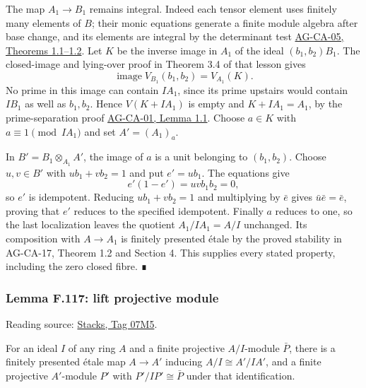 \documentclass[11pt,a4paper,openany]{report}
\begin{document}
The map \(A_1\to B_1\) remains integral. Indeed each tensor element uses finitely many elements of \(B\); their monic equations generate a finite module algebra after base change, and its elements are integral by the determinant test \href{https://github.com/KokunoYumeto/open-math-courses/blob/d02d0a3669f42579db037cd44de1d113fdd770a1/docs/courses/AG-CA/src/integral-extensions-lying-over-going-up-and-going-down.md}{AG-CA-05, Theorems 1.1--1.2}. Let \(K\) be the inverse image in \(A_1\) of the ideal \((b_1,b_2)B_1\). The closed-image and lying-over proof in Theorem 3.4 of that lesson gives \[
\operatorname{image}V_{B_1}(b_1,b_2)=V_{A_1}(K).
\] No prime in this image can contain \(IA_1\), since its prime upstairs would contain \(IB_1\) as well as \(b_1,b_2\). Hence \(V(K+IA_1)\) is empty and \(K+IA_1=A_1\), by the prime-separation proof \href{https://github.com/KokunoYumeto/open-math-courses/blob/d02d0a3669f42579db037cd44de1d113fdd770a1/docs/courses/AG-CA/src/spectra-of-rings.md}{AG-CA-01, Lemma 1.1}. Choose \(a\in K\) with \(a\equiv1\pmod {IA_1}\) and set \(A'=(A_1)_a\).

In \(B'=B_1\otimes_{A_1}A'\), the image of \(a\) is a unit belonging to \((b_1,b_2)\). Choose \(u,v\in B'\) with \(ub_1+vb_2=1\) and put \(e'=ub_1\). The equations give \[
e'(1-e')=uvb_1b_2=0,
\] so \(e'\) is idempotent. Reducing \(ub_1+vb_2=1\) and multiplying by \(\bar e\) gives \(\bar u\bar e=\bar e\), proving that \(e'\) reduces to the specified idempotent. Finally \(a\) reduces to one, so the last localization leaves the quotient \(A_1/IA_1=A/I\) unchanged. Its composition with \(A\to A_1\) is finitely presented étale by the proved stability in AG-CA-17, Theorem 1.2 and Section 4. This supplies every stated property, including the zero closed fibre. ∎

\label{AG-RG-S05-more-algebra-lemma-lift-projective-module}

\subsubsection{Lemma F.117: lift projective module}\label{AG-RG-S05-lemma-f.117-lift-projective-module}

Reading source: \href{https://stacks.math.columbia.edu/tag/07M5}{Stacks, Tag 07M5}.

For an ideal \(I\) of any ring \(A\) and a finite projective \(A/I\)-module \(\bar P\), there is a finitely presented étale map \(A\to A'\) inducing \(A/I\cong A'/IA'\), and a finite projective \(A'\)-module \(P'\) with \(P'/IP'\cong\bar P\) under that identification.
\end{document}

